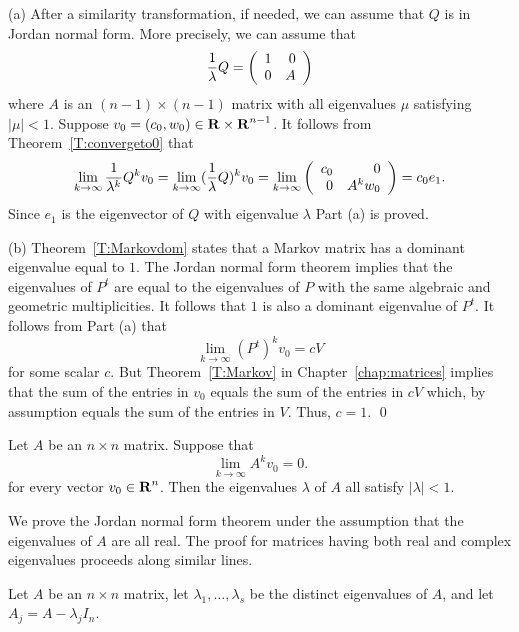 \proof  (a) After a similarity transformation, if needed, 
we can assume that $Q$ is in 
Jordan normal form.  More precisely, we can assume that 
\[
\frac{1}{\lambda}Q = \left(\begin{array}{rr} 1 & 0\\ 0 &A\end{array}\right)
\]
where $A$ is an $(n-1)\times (n-1)$ matrix with all eigenvalues $\mu$
satisfying $|\mu|<1$.  Suppose $v_0=(c_0,w_0)\in\mbox{$\bf{R}$}\times\mbox{$\bf{R}$}^{n-1}$.  It 
follows from Theorem~\ref{T:convergeto0} that 
\[
\lim_{k\to\infty}\frac{1}{\lambda^k}Q^kv_0 = 
\lim_{k\to\infty}(\frac{1}{\lambda}Q)^kv_0 =
\lim_{k\to\infty}\left(\begin{array}{rr} c_0 & 0\\ 0 &A^kw_0\end{array}\right) = c_0e_1.
\]
Since $e_1$ is the eigenvector of $Q$ with eigenvalue $\lambda$ Part (a) 
is proved.

(b)   Theorem~\ref{T:Markovdom} states that a Markov matrix has a dominant 
eigenvalue equal to $1$.  The Jordan normal form theorem implies that the 
eigenvalues of $P^t$ are equal to the eigenvalues of $P$ with the same 
algebraic and geometric multiplicities.  It follows that $1$ is also a 
dominant eigenvalue of $P^t$.  It follows from Part (a) that
\[
\lim_{k\to\infty}(P^t)^kv_0 = cV
\]
for some scalar $c$.  But Theorem~\ref{T:Markov} in 
Chapter~\ref{chap:matrices} implies that the sum of the
entries in $v_0$ equals the sum of the entries in $cV$ which, by assumption
equals the sum of the entries in $V$.  Thus, $c=1$.   \qed





\EXER

\TEXER

\begin{exercise} \label{c10.6.1}
Let $A$ be an $n\times n$ matrix.   Suppose that 
\[
\lim_{k\to\infty} A^kv_0 = 0.
\]
for every vector $v_0\in\mbox{$\bf{R}$}^n$.  Then the eigenvalues $\lambda$ of $A$ all
satisfy $|\lambda|<1$.
\end{exercise}






\label{S:Jordan} 

We prove the Jordan normal form theorem under the assumption that the 
eigenvalues of $A$ are all real.  The proof for matrices having both real and 
complex eigenvalues proceeds along similar lines.

Let $A$ be an $n\times n$ matrix, let $\lambda_1,\ldots,\lambda_s$ be the
distinct eigenvalues of $A$, and let $A_j = A-\lambda_jI_n$.

